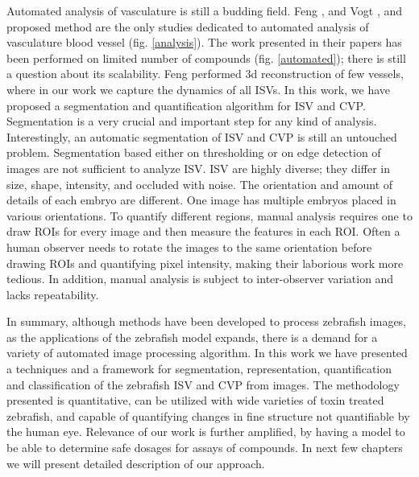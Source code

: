 \par
Automated analysis of vasculature is still a budding field. Feng \cite{Feng05}, and Vogt \cite{Vogt09}, and proposed method are the only studies dedicated to automated analysis of vasculature blood vessel (fig. \ref{analysis}).  The work presented in their papers has been performed on limited number of compounds (fig. \ref{automated}); there is still a question about its scalability. Feng \cite{Feng05} performed 3d reconstruction of few vessels, where in our work we capture the dynamics of all ISVs. In this work, we have proposed a segmentation and quantification algorithm for ISV and CVP. Segmentation is a very crucial and important step for any kind of analysis. Interestingly, an automatic segmentation of ISV and CVP is still an untouched problem. Segmentation based either on thresholding or on edge detection of images are not sufficient to analyze ISV. ISV are highly diverse; they differ in size, shape, intensity, and occluded with noise. The orientation and amount of details of each embryo are different. One image has multiple embryos placed in various orientations. %
To quantify different regions, manual analysis requires one to draw ROIs for every image and then measure the features in each ROI. Often a human observer needs to rotate the images to the same orientation before drawing ROIs and quantifying pixel intensity, making their laborious work more tedious. In addition, manual analysis is subject to inter-observer variation and lacks repeatability.
\par
In summary, although methods have been developed to process zebrafish images, as the applications of the zebrafish model expands, there is a demand for a variety of automated image processing algorithm. In this work we have presented a techniques and a framework for segmentation, representation, quantification and classification of the zebrafish ISV and CVP from  images. The methodology presented is quantitative, can be utilized with wide varieties of toxin treated zebrafish, and capable of quantifying changes in fine structure not quantifiable by the human eye. Relevance of our work is further amplified, by having a model to be able to determine safe dosages for assays of compounds. In next few chapters we will present detailed description of our approach.

